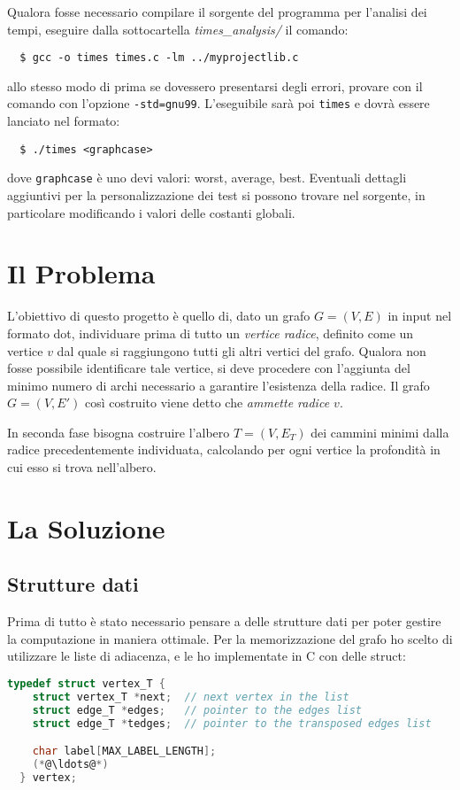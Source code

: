 \documentclass[a4paper,8pt]{article}
\theoremstyle{definition}
\begin{document}
Qualora fosse necessario compilare il sorgente del programma per l'analisi dei
tempi, eseguire dalla sottocartella \emph{times\_analysis/} il comando:
\begin{verbatim}
  $ gcc -o times times.c -lm ../myprojectlib.c
\end{verbatim}
allo stesso modo di prima se dovessero presentarsi degli errori, provare con il
comando con l'opzione \verb!-std=gnu99!. L'eseguibile sarà poi \verb!times!
e dovrà essere lanciato nel formato:
\begin{verbatim}
  $ ./times <graphcase>
\end{verbatim}
dove \verb!graphcase! è uno devi valori: worst, average, best. Eventuali dettagli
aggiuntivi per la personalizzazione dei test si possono trovare nel sorgente, in
particolare modificando i valori delle costanti globali.


\section{Il Problema}
L'obiettivo di questo progetto è quello di, dato un grafo $G=(V,E)$ in input nel
formato dot, individuare prima di tutto un \emph{vertice radice}, definito come
un vertice $v$ dal quale si raggiungono tutti gli altri vertici del grafo.
Qualora non fosse possibile identificare tale vertice, si deve procedere con
l'aggiunta del minimo numero di archi necessario a garantire l'esistenza della
radice. Il grafo $G=(V,E')$ così costruito viene detto che \emph{ammette radice $v$}.

In seconda fase bisogna costruire l'albero $T=(V,E_T)$ dei cammini minimi dalla
radice precedentemente individuata, calcolando per ogni vertice la profondità in
cui esso si trova nell'albero.


\section{La Soluzione}
\subsection{Strutture dati}
Prima di tutto è stato necessario pensare a delle strutture dati per poter gestire
la computazione in maniera ottimale. Per la memorizzazione del grafo ho scelto di
utilizzare le liste di adiacenza, e le ho implementate in C con delle struct:

\begin{lstlisting}[language=C]
  typedef struct vertex_T {
    struct vertex_T *next;  // next vertex in the list
    struct edge_T *edges;   // pointer to the edges list
    struct edge_T *tedges;  // pointer to the transposed edges list

    char label[MAX_LABEL_LENGTH];
    (*@\ldots@*)
  } vertex;
\end{lstlisting}
\end{document}
